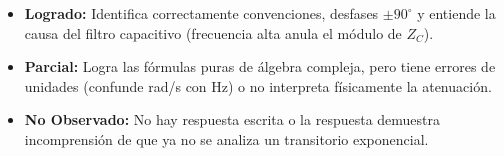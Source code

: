 \documentclass[11pt, a4paper]{article}
\begin{document}
\vspace{0.4cm}
\begin{tcolorbox}[colback=gray!5, colframe=black, title=\textbf{Rúbrica Cualitativa (Formato Diagnóstico)}]
\begin{itemize}
    \item \textbf{Logrado:} Identifica correctamente convenciones, desfases $\pm 90^\circ$ y entiende la causa del filtro capacitivo (frecuencia alta anula el módulo de $Z_C$).
    \item \textbf{Parcial:} Logra las fórmulas puras de álgebra compleja, pero tiene errores de unidades (confunde rad/s con Hz) o no interpreta físicamente la atenuación.
    \item \textbf{No Observado:} No hay respuesta escrita o la respuesta demuestra incomprensión de que ya no se analiza un transitorio exponencial.
\end{itemize}
\end{tcolorbox}
\end{document}
